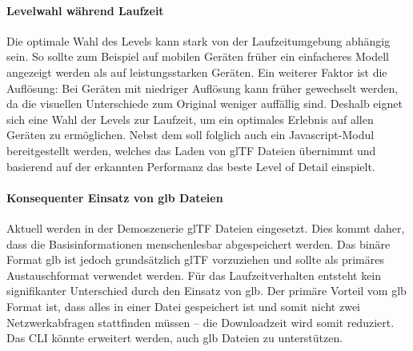 \paragraph{Levelwahl während Laufzeit}
Die optimale Wahl des Levels kann stark von der Laufzeitumgebung abhängig sein. So sollte zum Beispiel auf mobilen Geräten früher ein einfacheres Modell angezeigt werden als auf leistungsstarken Geräten. Ein weiterer Faktor ist die Auflösung: Bei Geräten mit niedriger Auflösung kann früher gewechselt werden, da die visuellen Unterschiede zum Original weniger auffällig sind.
Deshalb eignet sich eine Wahl der Levels zur Laufzeit, um ein optimales Erlebnis auf allen Geräten zu ermöglichen.
Nebst dem  soll folglich auch ein Javascript-Modul bereitgestellt werden, welches das Laden von glTF Dateien übernimmt und basierend auf der erkannten Performanz das beste Level of Detail einspielt.

\paragraph{Konsequenter Einsatz von glb Dateien}
Aktuell werden in der Demoszenerie glTF Dateien eingesetzt. Dies kommt daher, dass die Basisinformationen menschenlesbar abgespeichert werden. Das binäre Format glb ist jedoch grundsätzlich glTF vorzuziehen und sollte als primäres Austauschformat verwendet werden. Für das Laufzeitverhalten entsteht kein signifikanter Unterschied durch den Einsatz von glb. Der primäre Vorteil vom glb Format ist, dass alles in einer Datei gespeichert ist und somit nicht zwei Netzwerkabfragen stattfinden müssen – die Downloadzeit wird somit reduziert. Das CLI könnte erweitert werden, auch glb Dateien zu unterstützen.
